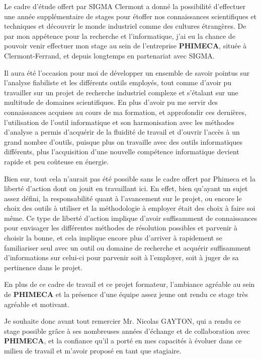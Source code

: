 \documentclass[a4paper,10pt]{article}
\begin{document}
Le cadre d'étude offert par SIGMA Clermont a donné la possibilité d’effectuer une année supplémentaire de stages pour étoffer nos connaissances scientifiques et techniques  et découvrir le monde industriel comme des cultures étrangères.
De par mon appétence pour la recherche et l'informatique, j'ai eu la chance de pouvoir venir effectuer mon stage au sein de l'entreprise \textbf{PHIMECA}, située à Clermont-Ferrand, et depuis longtemps en partenariat avec SIGMA. \bigskip

Il aura été l'occasion pour moi de développer un ensemble de savoir pointus sur l'analyse fiabiliste et les différents outils employés, tout comme d'avoir pu travailler sur un projet de recherche industriel complexe et s'étalant sur une multitude de domaines scientifiques. En plus d'avoir pu me servir des connaissances acquises au cours de ma formation, et approfondir ces dernières, l'utilisation de l'outil informatique et son harmonisation avec les méthodes d'analyse a permis d'acquérir de la fluidité de travail et d'ouvrir l'accès à un grand nombre d'outils, puisque plus on travaille avec des outils informatiques différents, plus l'acquisition d'une nouvelle compétence informatique devient rapide et peu coûteuse en énergie. \par \bigskip

Bien sur, tout cela n'aurait pas été possible sans le cadre offert par Phimeca et la liberté d'action dont on jouit en travaillant ici. En effet, bien qu'ayant un sujet assez défini, la responsabilité quant à l'avancement sur le projet, ou encore le choix des outils à utiliser et la méthodologie à employer était des choix à faire soi même. Ce type de liberté d'action implique d'avoir suffisamment de connaissances pour envisager les différentes méthodes de résolution possibles et parvenir à choisir la bonne, et cela implique encore plus d'arriver à rapidement se familiariser seul avec un outil ou domaine de recherche et acquérir suffisamment d'informations sur celui-ci pour parvenir soit à l'employer, soit à juger de sa pertinence dans le projet. \bigskip

En plus de ce cadre de travail et ce projet formateur, l'ambiance agréable au sein de \textbf{PHIMECA} et la présence d'une équipe assez jeune ont rendu ce stage très agréable et motivant.\bigskip

Je souhaite donc avant tout remercier Mr. Nicolas GAYTON, qui a rendu ce stage possible grâce à ses nombreuses années d'échange et de collaboration avec \textbf{PHIMECA}, et la confiance qu'il a porté en mes capacités à évoluer dans ce milieu de travail et m'avoir proposé en tant que stagiaire. \bigskip
\end{document}
